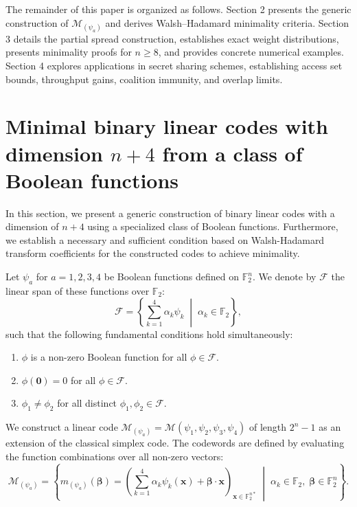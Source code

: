 \documentclass[pdflatex,sn-mathphys-num]{sn-jnl}%
\theoremstyle{thmstyleone}%
\theoremstyle{thmstyletwo}%
\theoremstyle{thmstylethree}%
\begin{document}
The remainder of this paper is organized as follows. Section 2 presents the generic construction of $\mathcal{M}_{(\psi_a)}$ and derives Walsh--Hadamard minimality criteria. Section 3 details the partial spread construction, establishes exact weight distributions, presents minimality proofs for $n \ge 8$, and provides concrete numerical examples. Section 4 explores applications in secret sharing schemes, establishing access set bounds, throughput gains, coalition immunity, and overlap limits.



\section{Minimal binary linear codes with dimension $n + 4$ from a class of Boolean functions}
In this section, we present a generic construction of binary linear codes with a dimension of $n + 4$ using a specialized class of Boolean functions. Furthermore, we establish a necessary and sufficient condition based on Walsh-Hadamard transform coefficients for the constructed codes to achieve minimality.

Let $\psi_a$ for $a = 1,2,3,4$ be Boolean functions defined on $\mathbb{F}_2^n$. We denote by $\mathcal{F}$ the linear span of these functions over $\mathbb{F}_2$:
\begin{equation}\label{eq:F_space}
\mathcal{F} = \left\{\sum_{k=1}^{4} \alpha_k \psi_k \;\middle|\; \alpha_k \in \mathbb{F}_2 \right\},
\end{equation}
such that the following fundamental conditions hold simultaneously:
\begin{enumerate}
    \item $\phi$ is a non-zero Boolean function for all $\phi \in \mathcal{F}$.
    \item $\phi(\mathbf{0}) = 0$ for all $\phi \in \mathcal{F}$.
    \item $\phi_1 \neq \phi_2$ for all distinct $\phi_1, \phi_2 \in \mathcal{F}$.
\end{enumerate}

We construct a linear code $\mathcal{M}_{(\psi_a)} = \mathcal{M}(\psi_1, \psi_2, \psi_3, \psi_4)$ of length $2^n-1$ as an extension of the classical simplex code. The codewords are defined by evaluating the function combinations over all non-zero vectors:
\begin{equation}\label{code}
\mathcal{M}_{(\psi_a)} = \left\{ m_{(\psi_a)}(\mathbf{\beta}) = \left( \sum_{k=1}^{4} \alpha_k \psi_k(\mathbf{x}) + \mathbf{\beta} \cdot \mathbf{x} \right)_{\mathbf{x} \in \mathbb{F}_2^{n*}} \;\middle|\; \alpha_k \in \mathbb{F}_2,\; \mathbf{\beta} \in \mathbb{F}_2^n \right\}.
\end{equation}
\end{document}
